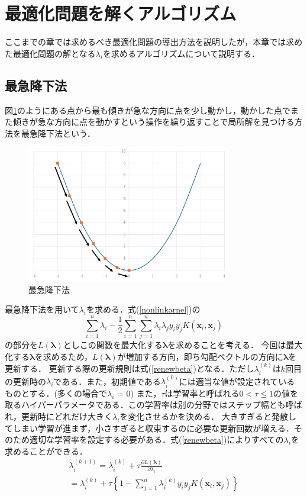 \documentclass[11pt,a4paper,titlepage]{ltjsarticle}
\begin{document}
\section{最適化問題を解くアルゴリズム}
ここまでの章では求めるべき最適化問題の導出方法を説明したが，本章では求めた最適化問題の解となる$\lambda_i$を求めるアルゴリズムについて説明する．
\subsection{最急降下法}
\label{saikyuu}
図\ref{parabora}のようにある点から最も傾きが急な方向に点を少し動かし，動かした点でまた傾きが急な方向に点を動かすという操作を繰り返すことで局所解を見つける方法を最急降下法という\cite{gradient-descent}．
\begin{figure}[H]
    \centering
    \includegraphics[width = 0.8\textwidth]{image/houbutsu.png}
    \caption{最急降下法}
    \label{parabora}
\end{figure}
最急降下法を用いて$\lambda_i$を求める．式(\ref{nonlinkarnel})の
$$\sum_{i=1}^{n}\lambda_i-\frac{1}{2}\sum_{i=1}^{n}\sum_{j=1}^{n}\lambda_i\lambda_jy_iy_jK(\bm{x}_i,\bm{x}_j)$$
の部分を$L(\bm{\lambda})$としこの関数を最大化する$\bm{\lambda}$を求めることを考える．
今回は最大化する$\bm{\lambda}$を求めるため，$L(\bm{\lambda})$が増加する方向，即ち勾配ベクトルの方向に$\bm{\lambda}$を更新する．
更新する際の更新規則は式(\ref{renewbeta})となる．ただし$\lambda_i^{(k)}$は$k$回目の更新時の$\lambda_i$である．また，初期値である$\lambda_i^{(0)}$には適当な値が設定されているものとする．(多くの場合で$\lambda_i$ = 0)
また，$\tau$は学習率と呼ばれる$0<\tau\leq1$の値を取るハイパーパラメータである．この学習率は別の分野ではステップ幅とも呼ばれ，更新時にどれだけ大きく$\lambda_i$を変化させるかを決める．
大きすぎると発散してしまい学習が進まず，小さすぎると収束するのに必要な更新回数が増える．そのため適切な学習率を設定する必要がある．式(\ref{renewbeta})によりすべての$\lambda_i$を求めることができる．
\begin{equation}
    \label{renewbeta}
    \begin{gathered}
        \lambda_i^{(k+1)} = \lambda_i^{(k)}+\tau\frac{\partial L(\bm{\lambda})}{\partial \lambda_i}\\
        =\lambda_i^{(k)} + \tau \left\{1 - \sum_{j=1}^{n}\lambda_i^{(k)}y_iy_jK(\bm{x}_i,\bm{x}_j)\right\}
    \end{gathered}
\end{equation}
\end{document}
